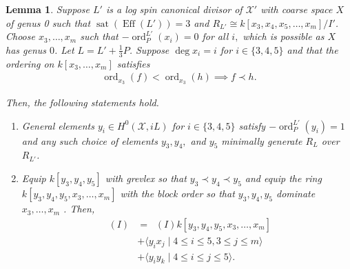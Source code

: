 \documentclass{amsart}
\theoremstyle{plain}
\newtheorem{lem}[thm]{Lemma}
\theoremstyle{definition}
\theoremstyle{remark}
\numberwithin{equation}{section}
\DeclareMathOperator{\ord}{ord}
\newcommand\sx{\mathscr X}
\newcommand{\halfcan}{L}
\DeclareMathOperator{\initial}{in_\prec}
\DeclareMathOperator{\Eff}{Eff}
\DeclareMathOperator{\sat}{sat}
\begin{document}
\begin{lem}
\label{lem:sat-3}
Suppose $L'$ is a log spin canonical divisor of $\sx'$ with coarse
space $X$ of genus 0 such that $\sat(\Eff(\halfcan')) = 3$ and $R_
{\halfcan'} \cong k[x_3, x_4 , x_5, \ldots, x_m]/I'$. Choose $x_3, \ldots, x_m$ such that $-\ord^{L'}_P(x_i)=0$ for all $i,$ which is possible as $X$ has genus $0$. Let $L = L' + \frac
{1}{3}P$. Suppose $\deg x_i = i$ for $i \in \{3, 4, 5\}$ and that
the ordering on $k[x_3, \ldots, x_m]$ satisfies
\begin{align*}
	\ord_{x_3}(f) < \ord_{x_3}(h) \implies f \prec h.
\end{align*}

\noindent
Then, the following statements hold.

\begin{enumerate}
	\item[(a)] General elements  $y_i \in H^0(\sx, iL)$ for $i \in \{3,
		4,5\}$ satisfy $-\ord_P^{\halfcan'}(y_i) = 1$ and any such choice of elements $y
		_3, y_4,$ and $y_5$ minimally generate $R_\halfcan$ over $R_{\halfcan'}$.
	\item[(b)] Equip $k[y_3, y_4, y_5]$ with grevlex so that $y_3 \prec 
		y_4 \prec y_5$
		and equip the ring $k[y_3, y_4, y_5, x_3, \ldots, x_m]$ with the block order so that $y_3, y_4, y_5$ dominate $x_3, \ldots, x_m$ .  Then,
		\begin{align*}
			\initial(I) &= \initial(I) k[y_3, y_4, y_5, x_3, \ldots, x_m] \\
			&+ \langle y_i x_j \mid 4 \leq i \leq 5, 3 \leq j \leq m\rangle \\
			&+ \langle y_i y_k \mid 4 \leq i \leq j \leq 5\rangle.
		\end{align*}
\end{enumerate}
\end{lem}
\end{document}
